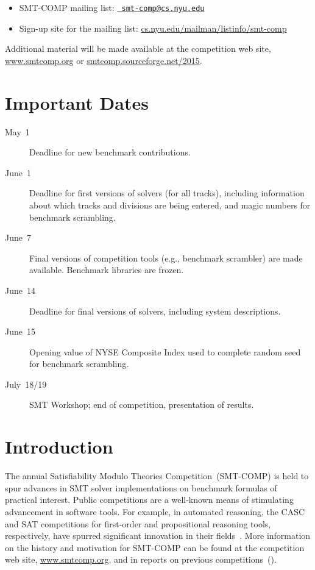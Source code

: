 \documentclass[12pt]{article}
\begin{document}
\begin{itemize}
\item SMT-COMP mailing list: \href{mailto:smt-comp@cs.nyu.edu}{\tt
  smt-comp@cs.nyu.edu}
\item Sign-up site for the mailing list:
  \url{cs.nyu.edu/mailman/listinfo/smt-comp}
\end{itemize}

\noindent Additional material will be made available at the
competition web site, \url{www.smtcomp.org} or
\url{smtcomp.sourceforge.net/2015}.


\newpage

\section{Important Dates}
\label{sec:important}

\begin{description}
\item[May~1] Deadline for new benchmark contributions.
\item[June~1] Deadline for first versions of solvers (for all tracks),
  including information about which tracks and divisions are being
  entered, and magic numbers for benchmark scrambling.
\item[June~7] Final versions of competition tools (e.g., benchmark
  scrambler) are made available.  Benchmark libraries are frozen.
\item[June~14] Deadline for final versions of solvers, including
  system descriptions.
\item[June~15] Opening value of NYSE Composite Index used to complete
  random seed for benchmark scrambling.
\item[July~18/19] SMT Workshop; end of competition, presentation of
  results.
\end{description}


\section{Introduction}

The annual Satisfiability Modulo Theories Competition~(SMT-COMP) is
held to spur advances in SMT solver implementations on benchmark
formulas of practical interest.  Public competitions are a well-known
means of stimulating advancement in software tools.  For example, in
automated reasoning, the CASC and SAT competitions for first-order and
propositional reasoning tools, respectively, have spurred significant
innovation in their fields~\cite{leberre+03,PSS02}.  More information
on the history and motivation for SMT-COMP can be found at the
competition web site, \url{www.smtcomp.org}, and in reports on
previous
competitions~(\cite{SMTCOMP-JAR,SMTCOMP-FMSD,BDOS08,SMTCOMP-2008,SMTCOMP-2014,SMTCOMP-2012,SMTEVAL-2013}).
\end{document}
